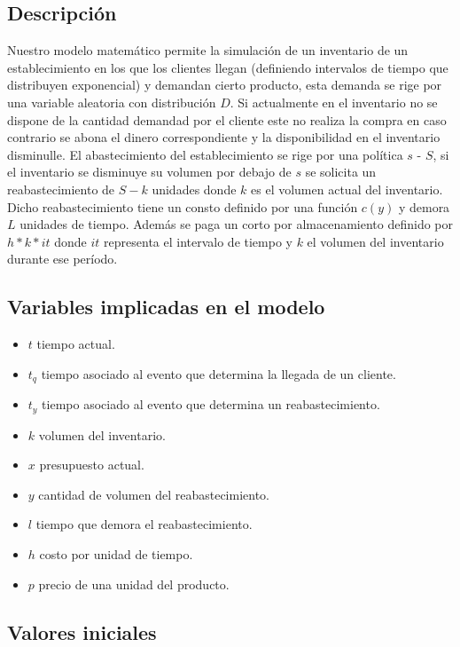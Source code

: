 \documentclass{article}
\begin{document}
\subsection*{Descripción}

Nuestro modelo matemático permite la simulación de un inventario de un establecimiento en los que los clientes llegan (definiendo intervalos de tiempo que distribuyen exponencial) y demandan cierto producto, esta demanda se rige por una variable aleatoria con distribución $D$. Si actualmente en el inventario no se dispone de la cantidad demandad por el cliente este no realiza la compra en caso contrario se abona el dinero correspondiente y la disponibilidad en el inventario disminulle. El abastecimiento del establecimiento se rige por una política $s$ - $S$, si el inventario se disminuye su volumen por debajo de $s$ se solicita un reabastecimiento de $S-k$ unidades donde $k$ es el volumen actual del inventario. Dicho reabastecimiento tiene un consto definido por una función $c(y)$ y demora $L$ unidades de tiempo. Además se paga un corto por almacenamiento definido por $h*k*it$ donde $it$ representa el intervalo de tiempo y $k$ el volumen del inventario durante ese período.

\subsection*{Variables implicadas en el modelo}

\begin{itemize}
    \item $t$ tiempo actual.
    \item $t_q$ tiempo asociado al evento que determina la llegada de un cliente.
    \item $t_y$ tiempo asociado al evento que determina un reabastecimiento.
    \item $k$ volumen del inventario.
    \item $x$ presupuesto actual.
    \item $y$ cantidad de volumen del reabastecimiento.
    \item $l$ tiempo que demora el reabastecimiento.
    \item $h$ costo por unidad de tiempo.
    \item $p$ precio de una unidad del producto.
\end{itemize}

\subsection*{Valores iniciales}
\end{document}
